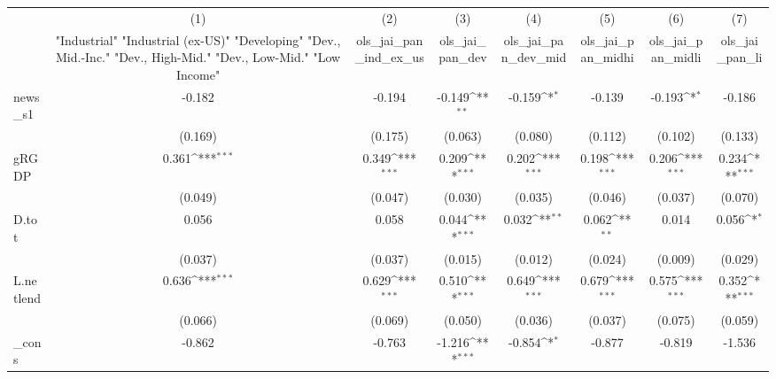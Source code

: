 {
\def\sym#1{\ifmmode^{#1}\else\(^{#1}\)\fi}
\begin{tabular}{l*{7}{c}}
\toprule
            &\multicolumn{1}{c}{(1)}&\multicolumn{1}{c}{(2)}&\multicolumn{1}{c}{(3)}&\multicolumn{1}{c}{(4)}&\multicolumn{1}{c}{(5)}&\multicolumn{1}{c}{(6)}&\multicolumn{1}{c}{(7)}\\
            &\multicolumn{1}{c}{ "Industrial" "Industrial (ex-US)" "Developing" "Dev., Mid.-Inc." "Dev., High-Mid."  "Dev., Low-Mid." "Low Income" }&\multicolumn{1}{c}{ols\_jai\_pan\_ind\_ex\_us}&\multicolumn{1}{c}{ols\_jai\_pan\_dev}&\multicolumn{1}{c}{ols\_jai\_pan\_dev\_mid}&\multicolumn{1}{c}{ols\_jai\_pan\_midhi}&\multicolumn{1}{c}{ols\_jai\_pan\_midli}&\multicolumn{1}{c}{ols\_jai\_pan\_li}\\
\midrule
news\_s1     &      -0.182         &      -0.194         &      -0.149\sym{**} &      -0.159\sym{*}  &      -0.139         &      -0.193\sym{*}  &      -0.186         \\
            &     (0.169)         &     (0.175)         &     (0.063)         &     (0.080)         &     (0.112)         &     (0.102)         &     (0.133)         \\
\addlinespace
gRGDP       &       0.361\sym{***}&       0.349\sym{***}&       0.209\sym{***}&       0.202\sym{***}&       0.198\sym{***}&       0.206\sym{***}&       0.234\sym{***}\\
            &     (0.049)         &     (0.047)         &     (0.030)         &     (0.035)         &     (0.046)         &     (0.037)         &     (0.070)         \\
\addlinespace
D.tot       &       0.056         &       0.058         &       0.044\sym{***}&       0.032\sym{**} &       0.062\sym{**} &       0.014         &       0.056\sym{*}  \\
            &     (0.037)         &     (0.037)         &     (0.015)         &     (0.012)         &     (0.024)         &     (0.009)         &     (0.029)         \\
\addlinespace
L.netlend   &       0.636\sym{***}&       0.629\sym{***}&       0.510\sym{***}&       0.649\sym{***}&       0.679\sym{***}&       0.575\sym{***}&       0.352\sym{***}\\
            &     (0.066)         &     (0.069)         &     (0.050)         &     (0.036)         &     (0.037)         &     (0.075)         &     (0.059)         \\
\addlinespace
\_cons      &      -0.862         &      -0.763         &      -1.216\sym{***}&      -0.854\sym{*}  &      -0.877         &      -0.819         &      -1.536         \\

\end{tabular}}
